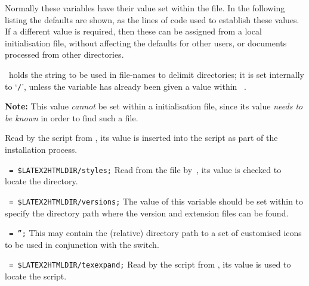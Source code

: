 Normally these variables have their value set within the  file.
In the following listing the defaults are shown, as the lines of \Perl{} code
used to establish these values.
If a different value is required, then these can be assigned from
a local  initialisation file, 
without affecting the defaults for other users, 
or documents processed from other directories.

\begin{htmllist}%
%
%
\item [\fn{\$dd} ]
~holds the string to be used in file-names to delimit directories;
it is set internally to `\texttt{/}', unless the variable has already been given
a value within ~.

\noindent
\textbf{Note:} This value \emph{cannot} be set within a  
initialisation file, since its value \emph{needs to be known} 
in order to find such a file.

%
\item [\fn{\$LATEX2HTMLDIR}] \latex{ }%
Read by the  script from , 
its value is inserted into the  \Perl{} script as part
of the installation process.

\item [\fn{\$LATEX2HTMLSTYLES}\texttt{ = \char34\$LATEX2HTMLDIR/styles\char34;}]
Read from the  file by \,,
its value is checked to locate the  directory.

\item [\fn{\$LATEX2HTMLVERSIONS}\texttt{ = \char34\$LATEX2HTMLDIR/versions\char34;}]
The value of this variable should be set within  
to specify the directory path where the version and extension files can be found.

\item [\fn{\$ALTERNATIVE\_ICONS}\texttt{ = '';}\label{alticons}]
This may contain the (relative) directory path to a set of customised icons
to be used in conjunction with the  switch.

%
\item [\fn{\$TEXEXPAND}\texttt{  = \char34\$LATEX2HTMLDIR/texexpand\char34;}]
Read by the  \Perl{} script from , 
its value is used to locate the  \Perl{} script.


\end{htmllist}
